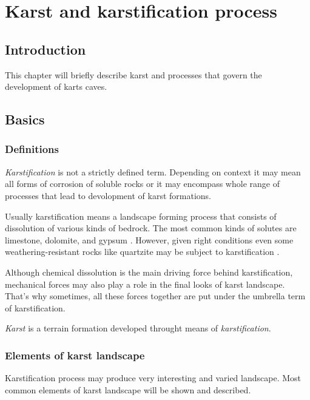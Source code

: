 \chapter{Karst and karstification process}
\section{Introduction}
This chapter will briefly describe karst and processes that govern the
development of karts caves.
\section{Basics}

\subsection{Definitions}
\emph{Karstification} is not a strictly defined term. Depending on context it may
mean all forms of corrosion of soluble rocks or it may encompass whole range of
processes that lead to devolopment of karst formations.

Usually karstification means a landscape forming process that consists of dissolution
of various kinds of bedrock. The most common kinds of solutes are limestone,
dolomite, and gypsum \parencite{karstglossary}. However, given right conditions
even some weathering-resistant rocks like quartzite may be subject to 
karstification \parencite{migon2010}.

Although chemical dissolution is the main driving force behind karstification,
mechanical forces may also play a role in the final looks of karst landscape.
That's why sometimes, all these forces together are put under the umbrella term
of karstification.

\emph{Karst} is a terrain formation developed throught means of
\emph{karstification}.

\subsection{Elements of karst landscape}

Karstification process may produce very interesting and varied landscape. Most
common elements of karst landscape will be shown and described.


